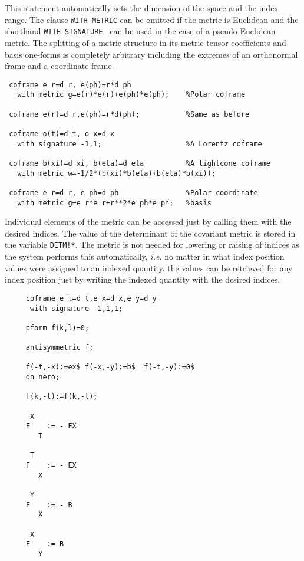  
This statement automatically sets the dimension of the space and the
index range. The clause {\tt WITH METRIC} can be omitted if the metric
is Euclidean and the shorthand {\tt WITH SIGNATURE }
\label{SIGNATURE} can be used in the case of a pseudo-Euclidean metric. The
splitting of a metric structure in its metric tensor coefficients and
basis one-forms is completely arbitrary including the extremes of an
orthonormal frame and a coordinate frame.

\example{}

\begin{verbatim}
 coframe e r=d r, e(ph)=r*d ph
   with metric g=e(r)*e(r)+e(ph)*e(ph);    %Polar coframe

 coframe e(r)=d r,e(ph)=r*d(ph);           %Same as before

 coframe o(t)=d t, o x=d x
   with signature -1,1;                    %A Lorentz coframe

 coframe b(xi)=d xi, b(eta)=d eta          %A lightcone coframe
   with metric w=-1/2*(b(xi)*b(eta)+b(eta)*b(xi));

 coframe e r=d r, e ph=d ph                %Polar coordinate
   with metric g=e r*e r+r**2*e ph*e ph;   %basis

\end{verbatim}

Individual elements of the metric can be accessed just by calling them
with the desired indices. The value of the determinant of the
 
covariant metric is stored in the variable {\tt DETM!*}.  The metric
is not needed for lowering or raising of indices as the system
performs this automatically, {\em i.e.} no matter in what index
position values were assigned to an indexed quantity, the values can
be retrieved for any index position just by writing the indexed
quantity with the desired indices.

\example{}

\begin{verbatim}
     coframe e t=d t,e x=d x,e y=d y
      with signature -1,1,1;

     pform f(k,l)=0;

     antisymmetric f;

     f(-t,-x):=ex$ f(-x,-y):=b$  f(-t,-y):=0$
     on nero;

     f(k,-l):=f(k,-l);

      X
     F    := - EX
        T

      T
     F    := - EX
        X

      Y
     F    := - B
        X

      X
     F    := B
        Y
\end{verbatim}

